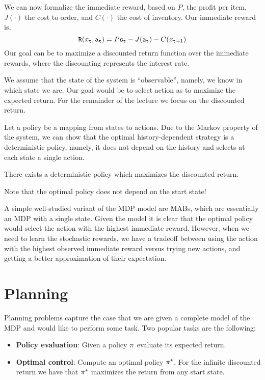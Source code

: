 We can now formalize the immediate reward, based on $P$, the profit
per item, $J(\cdot)$ the cost to order, and $C(\cdot)$ the cost of
inventory. Our immediate reward is,
\[
{\tt R}(x_{\tt t},{\tt a}_{\tt t})=P{\tt s}_{\tt t}-J({\tt a}_{\tt t})-C(x_{{\tt t}+1})
\]
Our goal can be to maximize a discounted return function over the
immediate rewards, where the discounting represents the interest
rate.

\medskip
{} We assume that the state of the
system is ``observable'', namely, we know in which state we are. Our
goal would be to select action as to maximize the expected return.
For the remainder of the lecture we focus on the discounted return.

Let a policy be a mapping from states to actions. Due to the Markov
property of the system, we can show that the optimal
history-dependent strategy is a deterministic policy, namely, it
does not depend on the history and selects at each state a single
action.

\begin{theorem}
There exists a deterministic policy which maximizes the discounted
return.
\end{theorem}

Note that the optimal policy does not depend on the start state!

\medskip
{}
%
A simple well-studied variant of the MDP model are MABs, which are
essentially an MDP with a single state. Given the model it is clear
that the optimal policy would select the action with the highest
immediate reward. However, when we need to learn the stochastic
rewards, we have a tradeoff between using the action with the
highest observed immediate reward versus trying new actions, and
getting a better approximation of their expectation.

\section{Planning}

Planning problems capture the case that we are given a complete
model of the MDP and would like to perform some task. Two popular
tasks are the following:
\begin{itemize}
\item
{\bf Policy evaluation}: Given a policy $\pi$ evaluate its
expected return.
\item
{\bf Optimal control}: Compute an optimal policy $\pi^*$. For
the infinite discounted return we have that $\pi^*$ maximizes
the return from any start state.
\end{itemize}

